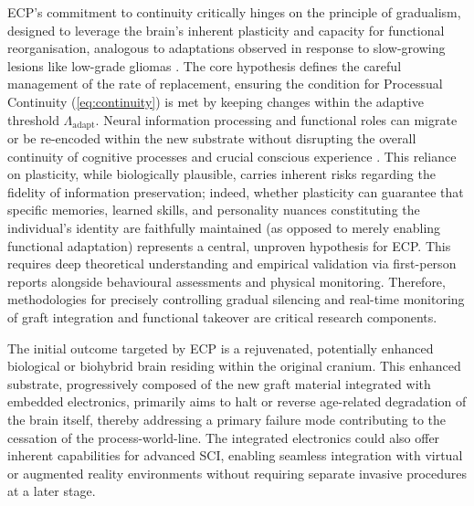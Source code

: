 \documentclass[10pt]{article}
\begin{document}
\begin{sloppypar}
  ECP’s commitment to continuity critically hinges on the principle of gradualism, designed to leverage the brain’s inherent plasticity and capacity for functional reorganisation, analogous to adaptations observed in response to slow-growing lesions like low-grade gliomas \citep{desmurget_contrasting_2007,duffau_huge_2014}. The core hypothesis defines the careful management of the rate of replacement, ensuring the condition for Processual Continuity (\autoref{eq:continuity}) is met by keeping changes within the adaptive threshold \( \Lambda_{\text{adapt}} \). Neural information processing and functional roles can migrate or be re-encoded within the new substrate without disrupting the overall continuity of cognitive processes and crucial conscious experience \citep{hebert_lab_research_2025,hebert_could_2022,jin_integration_2023}. This reliance on plasticity, while biologically plausible, carries inherent risks regarding the fidelity of information preservation; indeed, whether plasticity can guarantee that specific memories, learned skills, and personality nuances constituting the individual’s identity are faithfully maintained (as opposed to merely enabling functional adaptation) represents a central, unproven hypothesis for ECP. This requires deep theoretical understanding and empirical validation via first-person reports alongside behavioural assessments and physical monitoring. Therefore, methodologies for precisely controlling gradual silencing and real-time monitoring of graft integration and functional takeover are critical research components.

  The initial outcome targeted by ECP is a rejuvenated, potentially enhanced biological or biohybrid brain residing within the original cranium. This enhanced substrate, progressively composed of the new graft material integrated with embedded electronics, primarily aims to halt or reverse age-related degradation of the brain itself, thereby addressing a primary failure mode contributing to the cessation of the process-world-line. The integrated electronics could also offer inherent capabilities for advanced SCI, enabling seamless integration with virtual or augmented reality environments without requiring separate invasive procedures at a later stage.


\end{sloppypar}
\end{document}
